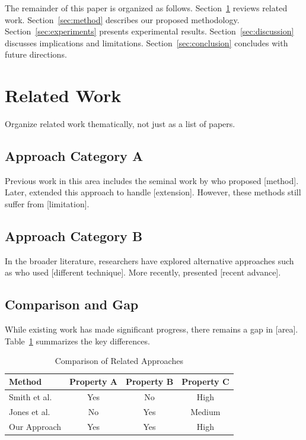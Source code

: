 \documentclass[conference]{IEEEtran}
\theoremstyle{plain}
\theoremstyle{definition}
\begin{document}
The remainder of this paper is organized as follows. Section~\ref{sec:related}
reviews related work. Section~\ref{sec:method} describes our proposed methodology.
Section~\ref{sec:experiments} presents experimental results.
Section~\ref{sec:discussion} discusses implications and limitations.
Section~\ref{sec:conclusion} concludes with future directions.

\section{Related Work}
\label{sec:related}

Organize related work thematically, not just as a list of papers.

\subsection{Approach Category A}

Previous work in this area includes the seminal work by \cite{author2020} who
proposed [method]. Later, \cite{other2021} extended this approach to handle
[extension]. However, these methods still suffer from [limitation].

\subsection{Approach Category B}

In the broader literature, researchers have explored alternative approaches
such as \cite{diff2022} who used [different technique]. More recently,
\cite{recent2023} presented [recent advance].

\subsection{Comparison and Gap}

While existing work has made significant progress, there remains a gap in
[area]. Table~\ref{tab:comparison} summarizes the key differences.

\begin{table}[htbp]
\caption{Comparison of Related Approaches}
\label{tab:comparison}
\begin{center}
\begin{tabular}{|l|c|c|c|}
\hline
\textbf{Method} & \textbf{Property A} & \textbf{Property B} & \textbf{Property C} \\
\hline
Smith et al. \cite{smith2023} & Yes & No & High \\
Jones et al. \cite{jones2022} & No & Yes & Medium \\
Our Approach & Yes & Yes & High \\
\hline
\end{tabular}
\end{center}
\end{table}
\end{document}
